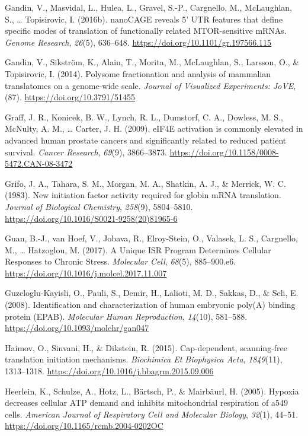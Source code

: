 \documentclass[12pt,openany]{book}
\begin{document}
\hypertarget{ref-Gandin2016a}{}
Gandin, V., Masvidal, L., Hulea, L., Gravel, S.-P., Cargnello, M.,
McLaughlan, S., \ldots{} Topisirovic, I. (2016b). nanoCAGE reveals 5'
UTR features that define specific modes of translation of functionally
related MTOR-sensitive mRNAs. \emph{Genome Research}, \emph{26}(5),
636--648. \url{https://doi.org/10.1101/gr.197566.115}

\hypertarget{ref-Gandin2014}{}
Gandin, V., Sikström, K., Alain, T., Morita, M., McLaughlan, S.,
Larsson, O., \& Topisirovic, I. (2014). Polysome fractionation and
analysis of mammalian translatomes on a genome-wide scale. \emph{Journal
of Visualized Experiments: JoVE}, (87).
\url{https://doi.org/10.3791/51455}

\hypertarget{ref-Graff2009}{}
Graff, J. R., Konicek, B. W., Lynch, R. L., Dumstorf, C. A., Dowless, M.
S., McNulty, A. M., \ldots{} Carter, J. H. (2009). eIF4E activation is
commonly elevated in advanced human prostate cancers and significantly
related to reduced patient survival. \emph{Cancer Research},
\emph{69}(9), 3866--3873.
\url{https://doi.org/10.1158/0008-5472.CAN-08-3472}

\hypertarget{ref-Grifo1983}{}
Grifo, J. A., Tahara, S. M., Morgan, M. A., Shatkin, A. J., \& Merrick,
W. C. (1983). New initiation factor activity required for globin mRNA
translation. \emph{Journal of Biological Chemistry}, \emph{258}(9),
5804--5810. \url{https://doi.org/10.1016/S0021-9258(20)81965-6}

\hypertarget{ref-Guan2017}{}
Guan, B.-J., van Hoef, V., Jobava, R., Elroy-Stein, O., Valasek, L. S.,
Cargnello, M., \ldots{} Hatzoglou, M. (2017). A Unique ISR Program
Determines Cellular Responses to Chronic Stress. \emph{Molecular Cell},
\emph{68}(5), 885--900.e6.
\url{https://doi.org/10.1016/j.molcel.2017.11.007}

\hypertarget{ref-Guzeloglu-Kayisli2008}{}
Guzeloglu-Kayisli, O., Pauli, S., Demir, H., Lalioti, M. D., Sakkas, D.,
\& Seli, E. (2008). Identification and characterization of human
embryonic poly(A) binding protein (EPAB). \emph{Molecular Human
Reproduction}, \emph{14}(10), 581--588.
\url{https://doi.org/10.1093/molehr/gan047}

\hypertarget{ref-Haimov2015}{}
Haimov, O., Sinvani, H., \& Dikstein, R. (2015). Cap-dependent,
scanning-free translation initiation mechanisms. \emph{Biochimica Et
Biophysica Acta}, \emph{1849}(11), 1313--1318.
\url{https://doi.org/10.1016/j.bbagrm.2015.09.006}

\hypertarget{ref-Heerlein2005}{}
Heerlein, K., Schulze, A., Hotz, L., Bärtsch, P., \& Mairbäurl, H.
(2005). Hypoxia decreases cellular ATP demand and inhibits mitochondrial
respiration of a549 cells. \emph{American Journal of Respiratory Cell
and Molecular Biology}, \emph{32}(1), 44--51.
\url{https://doi.org/10.1165/rcmb.2004-0202OC}
\end{document}
